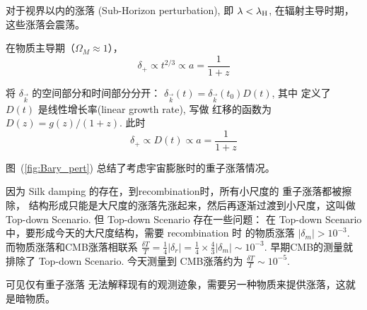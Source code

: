 \documentclass[12pt]{ctexart}
\newcommand{\reffig}[1]{图~(\ref{#1})}
\begin{document}
对于视界以内的涨落 (Sub-Horizon perturbation), 即 $\lambda < \lambda_{\rm{H}}$, 在辐射主导时期，这些涨落会震荡。



在物质主导期（$\Omega_M\approx 1$），
\begin{equation}
    \delta_{+}  \propto  t^{2/3} \propto a =\frac{1}{1+z}
\end{equation}

将 $\delta_{\vec{k}}$   的空间部分和时间部分分开： $\delta_{\vec{k}}(t) = \delta_{\vec{k}}(t_0) D(t)$, 其中 定义了 $D(t)$ 是线性增长率(linear growth rate), 写做 红移的函数为 $D(z)=g(z)/(1+z)$.
此时 
\begin{equation}
    \delta_{+} \propto D(t) \propto a =\frac{1}{1+z}
\end{equation}



\reffig{fig:Bary_pert} 总结了考虑宇宙膨胀时的重子涨落情况。

因为 Silk damping 的存在，到recombination时，所有小尺度的 重子涨落都被擦除，
结构形成只能是大尺度的涨落先涨起来，然后再逐渐过渡到小尺度，这叫做
Top-down Scenario.
但 Top-down Scenario
存在一些问题：
在 Top-down Scenario 中，要形成今天的大尺度结构，需要 recombination 时
的物质涨落 $|\delta_m|> 10^{-3}$. 
而物质涨落和CMB涨落相联系
$\frac{\delta T}{T}=\frac{1}{4} |\delta_r| = \frac{1}{4} \times \frac{4}{3} |\delta_m| \sim 10^{-3}$.
早期CMB的测量就排除了 Top-down Scenario. 今天测量到 CMB涨落约为 
$\frac{\delta T}{T} \sim 10^{-5}$.

可见仅有重子涨落 无法解释现有的观测迹象，需要另一种物质来提供涨落，这就是暗物质。
\end{document}
